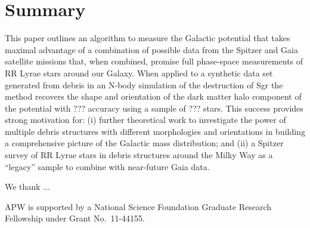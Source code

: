 \documentclass[preprint]{aastex}
\begin{document}
\section{Summary}

This paper outlines an algorithm to measure the Galactic potential that takes maximal advantage of a combination of possible data from the Spitzer and Gaia satellite
missions that, when combined,  promise full phase-space measurements of RR Lyrae stars around our Galaxy.
When applied to a synthetic data set generated from debris in an N-body simulation of the destruction of Sgr the method recovers the shape and orientation of the dark
matter halo component of the potential with ??? accuracy using a sample of ??? stars.
This success provides strong motivation for: (i) further theoretical work to investigate the power of multiple debris structures with different morphologies and orientations in
building a comprehensive picture of the Galactic mass distribution; and (ii) a  Spitzer survey of RR Lyrae stars in debris structures around the Milky Way as a ``legacy''
sample to combine with near-future Gaia data.

\acknowledgments
We thank ...

APW is supported by a National Science Foundation Graduate Research Fellowship under Grant No.\ 11-44155.



\end{document}
